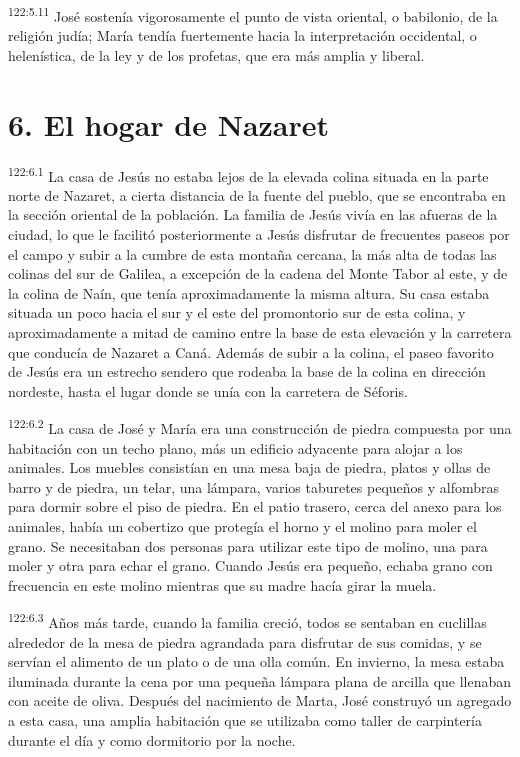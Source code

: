 \par 
\textsuperscript{122:5.11} José sostenía vigorosamente el punto de vista oriental, o babilonio, de la religión judía; María tendía fuertemente hacia la interpretación occidental, o helenística, de la ley y de los profetas, que era más amplia y liberal.

\section*{6. El hogar de Nazaret}
\par 
\textsuperscript{122:6.1} La casa de Jesús no estaba lejos de la elevada colina situada en la parte norte de Nazaret, a cierta distancia de la fuente del pueblo, que se encontraba en la sección oriental de la población. La familia de Jesús vivía en las afueras de la ciudad, lo que le facilitó posteriormente a Jesús disfrutar de frecuentes paseos por el campo y subir a la cumbre de esta montaña cercana, la más alta de todas las colinas del sur de Galilea, a excepción de la cadena del Monte Tabor al este, y de la colina de Naín, que tenía aproximadamente la misma altura. Su casa estaba situada un poco hacia el sur y el este del promontorio sur de esta colina, y aproximadamente a mitad de camino entre la base de esta elevación y la carretera que conducía de Nazaret a Caná. Además de subir a la colina, el paseo favorito de Jesús era un estrecho sendero que rodeaba la base de la colina en dirección nordeste, hasta el lugar donde se unía con la carretera de Séforis.

\par 
\textsuperscript{122:6.2} La casa de José y María era una construcción de piedra compuesta por una habitación con un techo plano, más un edificio adyacente para alojar a los animales. Los muebles consistían en una mesa baja de piedra, platos y ollas de barro y de piedra, un telar, una lámpara, varios taburetes pequeños y alfombras para dormir sobre el piso de piedra. En el patio trasero, cerca del anexo para los animales, había un cobertizo que protegía el horno y el molino para moler el grano. Se necesitaban dos personas para utilizar este tipo de molino, una para moler y otra para echar el grano. Cuando Jesús era pequeño, echaba grano con frecuencia en este molino mientras que su madre hacía girar la muela.

\par 
\textsuperscript{122:6.3} Años más tarde, cuando la familia creció, todos se sentaban en cuclillas alrededor de la mesa de piedra agrandada para disfrutar de sus comidas, y se servían el alimento de un plato o de una olla común. En invierno, la mesa estaba iluminada durante la cena por una pequeña lámpara plana de arcilla que llenaban con aceite de oliva. Después del nacimiento de Marta, José construyó un agregado a esta casa, una amplia habitación que se utilizaba como taller de carpintería durante el día y como dormitorio por la noche.

